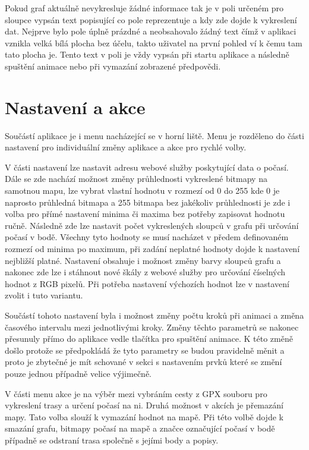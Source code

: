 \documentclass[czech,bachelor,dept460,male,csharp,cpdeclaration]{diploma}
\begin{document}
	Pokud graf aktuálně nevykresluje žádné informace tak je v poli určeném pro sloupce vypsán text popisující co pole reprezentuje a kdy zde dojde k vykreslení dat. Nejprve bylo pole úplně prázdné a neobsahovalo žádný text čímž v aplikaci vznikla velká bílá plocha bez účelu, takto uživatel na první pohled ví k čemu tam tato plocha je. Tento text v poli je vždy vypsán při startu aplikace a následně spuštění animace nebo při vymazání zobrazené předpovědi.
	
	\section{Nastavení a akce}
	
	Součástí aplikace je i menu nacházející se v horní liště. Menu je rozděleno do části nastavení pro individuální změny aplikace a akce pro rychlé volby.
	
	V části nastavení lze nastavit adresu webové služby poskytující data o počasí. Dále se zde nachází možnost změny průhlednosti vykreslené bitmapy na samotnou mapu, lze vybrat vlastní hodnotu v rozmezí od 0 do 255 kde 0 je naprosto průhledná bitmapa a 255 bitmapa bez jakékoliv průhlednosti je zde i volba pro přímé nastavení minima či maxima bez potřeby zapisovat hodnotu ručně. Následně zde lze nastavit počet vykreslených sloupců v grafu při určování počasí v bodě. Všechny tyto hodnoty se musí nacházet v předem definovaném rozmezí od minima po maximum, při zadání neplatné hodnoty dojde k nastavení nejbližší platné. Nastavení obsahuje i možnost změny barvy sloupců grafu a nakonec zde lze i stáhnout nové škály z webové služby pro určování číselných hodnot z RGB pixelů. Při potřeba nastavení výchozích hodnot lze v nastavení zvolit i tuto variantu.
	
	Součástí tohoto nastavení byla i možnost změny počtu kroků při animaci a změna časového intervalu mezi jednotlivými kroky. Změny těchto parametrů se nakonec přesunuly přímo do aplikace vedle tlačítka pro spuštění animace. K této změně došlo protože se předpokládá že tyto parametry se budou pravidelně měnit a proto je zbytečné je mít schované v sekci s nastavením prvků které se změní pouze jednou případně velice výjimečně.
	
	V části menu akce je na výběr mezi vybráním cesty z GPX souboru pro vykreslení trasy a určení počasí na ni. Druhá možnost v akcích je přemazání mapy. Tato volba slouží k vymazání hodnot na mapě. Při této volbě dojde k smazání grafu, bitmapy počasí na mapě a značce označující počasí v bodě případně se odstraní trasa společně s jejími body a popisy.
	
\end{document}
